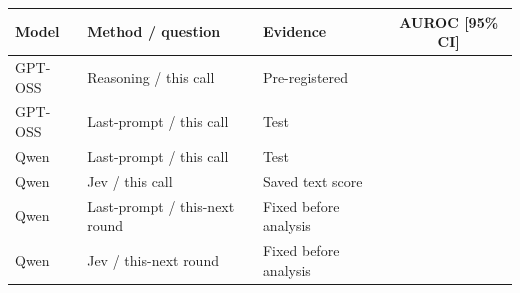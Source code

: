 \begin{tabular}{lllc}
\toprule
Model & Method / question & Evidence & AUROC [95\% CI] \\
\midrule
GPT-OSS & Reasoning / this call & Pre-registered & \gptossFreshReasoning{} \gptossFreshReasoningCI{} \\
GPT-OSS & Last-prompt / this call & Test & \gptossFreshCallProbe{} \gptossFreshCallProbeCI{} \\
Qwen & Last-prompt / this call & Test & \qwenFreshCallProbe{} \qwenFreshCallProbeCI{} \\
Qwen & Jev / this call & Saved text score & \qwenFreshCallJev{} \qwenFreshCallJevCI{} \\
Qwen & Last-prompt / this-next round & Fixed before analysis & \qwenFreshNearProbe{} \qwenFreshNearProbeCI{} \\
Qwen & Jev / this-next round & Fixed before analysis & \qwenFreshNearJev{} \qwenFreshNearJevCI{} \\
\bottomrule
\end{tabular}
